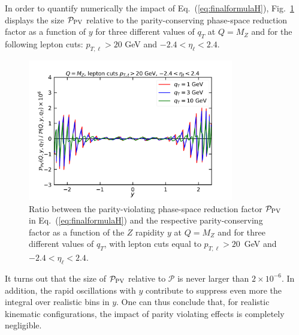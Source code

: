 \documentclass[10pt,a4paper]{article}
\begin{document}
In order to quantify numerically the impact of
Eq.~(\ref{eq:finalformulaH}), Fig.~\ref{fig:PhaseSpaceRedFactor}
displays the size $\mathcal{P}_{\rm PV}$ relative to the
parity-conserving phase-space reduction factor as a function of $y$
for three different values of $q_T$ at $Q=M_Z$ and for the following
lepton cuts: $p_{T,\ell}>20$ GeV and $-2.4 < \eta_\ell < 2.4$.
\begin{figure}[t]
  \begin{centering}
    \includegraphics[width=0.8\textwidth]{plots/PhaseSpaceRedFactor.pdf}
    \caption{Ratio between the parity-violating phase-space reduction
      factor $\mathcal{P}_{\rm PV}$ in Eq.~(\ref{eq:finalformulaH})
      and the respective parity-conserving factor as a function of the
      $Z$ rapidity $y$ at $Q=M_Z$ and for three different values of
      $q_T$, with lepton cuts equal to $p_{T,\ell}>20$~GeV and
      $-2.4 < \eta_\ell < 2.4$.\label{fig:PhaseSpaceRedFactor}}
  \end{centering}
\end{figure}
It turns out that the size of $\mathcal{P}_{\rm PV}$ relative to
$\mathcal{P}$ is never larger than $2\times10^{-6}$. In addition, the
rapid oscillations with $y$ contribute to suppress even more the
integral over realistic bins in $y$. One can thus conclude that, for
realistic kinematic configurations, the impact of parity violating
effects is completely negligible.

\end{document}
